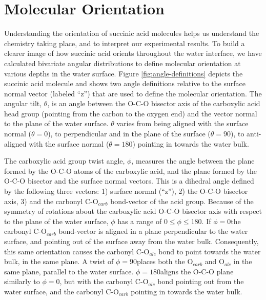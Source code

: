 \section {Molecular Orientation}

Understanding the orientation of succinic acid molecules helps us understand the chemistry taking place, and to interpret our experimental results. To build a clearer image of how succinic acid orients throughout the water interface, we have calculated bivariate angular distributions to define molecular orientation at various depths in the water surface. Figure \ref{fig:angle-definitions} depicts the succinic acid molecule and shows two angle definitions relative to the surface normal vector (labeled ``z'') that are used to define the molecular orientation. The angular tilt, $\theta$, is an angle between the O-C-O bisector axis of the carboxylic acid head group (pointing from the carbon to the oxygen end) and the vector normal to the plane of the water surface. $\theta$ varies from being aligned with the surface normal ($\theta=0$\textdegree), to perpendicular and in the plane of the surface ($\theta=90$\textdegree), to anti-aligned with the surface normal ($\theta=180$\textdegree) pointing in towards the water bulk. 

The carboxylic acid group twist angle, $\phi$, measures the angle between the plane formed by the O-C-O atoms of the carboxylic acid, and the plane formed by the O-C-O bisector and the surface normal vectors. This is a dihedral angle defined by the following three vectors: 1) surface normal (``z''), 2) the O-C-O bisector axis, 3) and the carbonyl C-O$_{carb}$ bond-vector of the acid group. Because of the symmetry of rotations about the carboxylic acid O-C-O bisector axis with respect to the plane of the water surface, $\phi$ has a range of 0\textdegree $ \le \phi \le $180\textdegree. If $\phi=0$\textdegree the carbonyl C-O$_{carb}$ bond-vector is aligned in a plane perpendicular to the water surface, and pointing out of the surface away from the water bulk. Consequently, this same orientation causes the carbonyl C-O$_{alc}$ bond to point towards the water bulk, in the same plane. A twist of $\phi=90$\textdegree places both the O$_{carb}$ and O$_{alc}$ in the same plane, parallel to the water surface. $\phi=180$\textdegree aligns the O-C-O plane similarly to $\phi=0$\textdegree, but with the carbonyl C-O$_{alc}$ bond pointing out from the water surface, and the carbonyl C-O$_{carb}$ pointing in towards the water bulk. 

